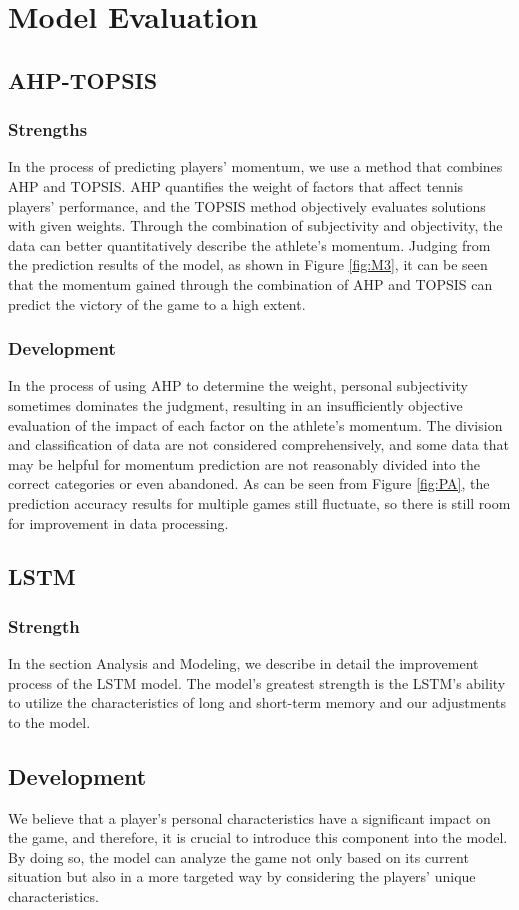 \section{Model Evaluation}
\subsection{AHP-TOPSIS}
\subsubsection{Strengths}
In the process of predicting players' momentum, we use a method that combines AHP and TOPSIS. AHP quantifies the weight of factors that affect tennis players' performance, and the TOPSIS method objectively evaluates solutions with given weights. Through the combination of subjectivity and objectivity, the data can better quantitatively describe the athlete's momentum. Judging from the prediction results of the model, as shown in Figure \ref{fig:M3}, it can be seen that the momentum gained through the combination of AHP and TOPSIS can predict the victory of the game to a high extent.
\subsubsection{Development}
In the process of using AHP to determine the weight, personal subjectivity sometimes dominates the judgment, resulting in an insufficiently objective evaluation of the impact of each factor on the athlete's momentum. The division and classification of data are not considered comprehensively, and some data that may be helpful for momentum prediction are not reasonably divided into the correct categories or even abandoned. As can be seen from Figure \ref{fig:PA}, the prediction accuracy results for multiple games still fluctuate, so there is still room for improvement in data processing.

\subsection{LSTM}
\subsubsection{Strength}
In the section Analysis and Modeling, we describe in detail the improvement process of the LSTM model. The model's greatest strength is the LSTM's ability to utilize the characteristics of long and short-term memory and our adjustments to the model.

\subsection{Development}
We believe that a player's personal characteristics have a significant impact on the game, and therefore, it is crucial to introduce this component into the model. By doing so, the model can analyze the game not only based on its current situation but also in a more targeted way by considering the players' unique characteristics.